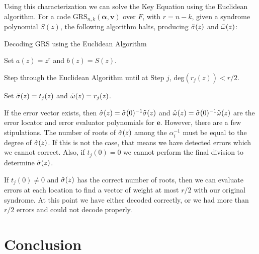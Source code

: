 \documentclass{article}
\begin{document}
Using this characterization we can solve the Key Equation using the Euclidean algorithm. For a code $\text{GRS}_{n,k}(\boldsymbol\alpha, \textbf{v})$ over $F$, with $r = n - k$, given a syndrome polynomial $S(z)$, the following algorithm halts, producing $\Tilde{\sigma}(z)$ and $\Tilde{\omega}(z)$:
\begin{algorithm}[H]
	\caption{Decoding GRS using the Euclidean Algorithm\label{decoding}}
	Set $a(z) = z^{r}$ and $b(z) = S(z)$.
	
	Step through the Euclidean Algorithm until at Step $j$, deg$(r_{j}(z)) < r/2$.
	
	Set $\Tilde{\sigma}(z) = t_{j}(z)$ and $\Tilde{\omega}(z) = r_{j}(z)$.
\end{algorithm}
If the error vector exists, then $\Hat{\sigma}(z) = \Tilde{\sigma}(0)^{-1}\Tilde{\sigma}(z)$ and $\Hat{\omega}(z) = \Tilde{\sigma}(0)^{-1}\Tilde{\omega}(z)$ are the error locator and error evaluator polynomials for $\textbf{e}$. However, there are a few stipulations. The number of roots of $\Hat{\sigma}(z)$ among the $\alpha_{i}^{-1}$ must be equal to the degree of $\Hat{\sigma}(z)$. If this is not the case, that means we have detected errors which we cannot correct. Also, if $t_{j}(0) = 0$ we cannot perform the final division to determine $\Hat{\sigma}(z)$.

If $t_{j}(0) \neq 0$ and $\Hat{\sigma}(z)$ has the correct number of roots, then we can evaluate errors at each location to find a vector of weight at most $r/2$ with our original syndrome. At this point we have either decoded correctly, or we had more than $r/2$ errors and could not decode properly.

\section{Conclusion}
\end{document}
